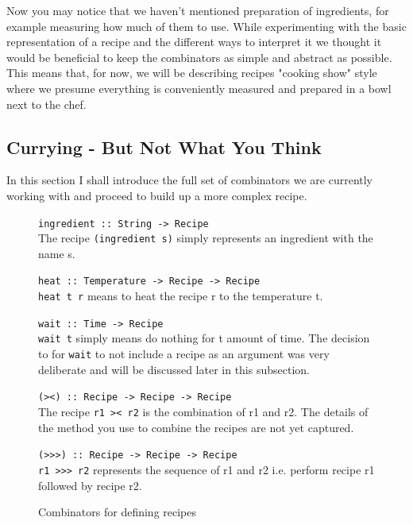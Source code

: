\documentclass[11pt]{article}
\begin{document}
    Now you may notice that we haven't mentioned preparation of ingredients,
    for example measuring how much of them to use. While experimenting with
    the basic representation of a recipe and the different ways to interpret
    it we thought it would be beneficial to keep the combinators as simple
    and abstract as possible. This means that, for now, we will be describing
    recipes "cooking show" style where we presume everything is conveniently
    measured and prepared in a bowl next to the chef.

    \subsection{Currying - But Not What You Think}
    In this section I shall introduce the full set of combinators we are
    currently working with and proceed to build up a more complex recipe.

    \begin{figure}
        \centering
            \begin{multicols}{2}
                \raggedright
                \footnotesize
                \texttt{ingredient :: String -> Recipe} \\
                The recipe \texttt{(ingredient s)} simply represents an ingredient
                with the name s.

                \texttt{heat :: Temperature -> Recipe -> Recipe} \\
                \texttt{heat t r} means to heat the recipe r to the temperature t.

                \texttt{wait :: Time -> Recipe} \\
                \texttt{wait t} simply means do nothing for t amount of time.
                The decision to for \texttt{wait} to not include a recipe as
                an argument was very deliberate and will be discussed later
                in this subsection.

                \texttt{(><) :: Recipe -> Recipe -> Recipe} \\
                The recipe \texttt{r1 >< r2} is the combination of r1 and r2.
                The details of the method you use to combine the recipes are
                not yet captured.

                \texttt{(>>>) :: Recipe -> Recipe -> Recipe} \\
                \texttt{r1 >>> r2} represents the sequence of r1 and r2 i.e.
                perform recipe r1 followed by recipe r2.
            \end{multicols}
        \caption{Combinators for defining recipes}
    \end{figure}
\end{document}

